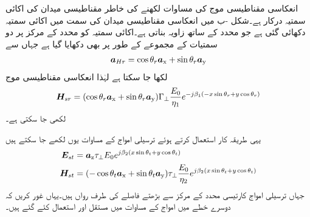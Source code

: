 انعکاسی مقناطیسی موج کی مساوات لکھنے کی خاطر مقناطیسی میدان کی اکائی سمتیہ درکار ہے۔شکل -ب میں انعکاسی مقناطیسی میدان کی سمت میں اکائی سمتیہ  دکھائی گئی ہے جو  محدد کے ساتھ  زاویہ بناتی ہے۔اکائی سمتیہ کو محدد کے مرکز پر دو سمتیات کے مجموعے کے طور پر بھی دکھایا گیا ہے جہاں سے
\begin{align}
{\ensuremath{{\boldsymbol{a}}}}_{Hr}=\cos \theta_r {\boldsymbol{a}}_{\textup{x}}+\sin \theta_r {\boldsymbol{a}}_{\textup{y}}
\end{align}
لکھا جا سکتا ہے لہٰذا انعکاسی مقناطیسی موج
\begin{align} \label{مساوات_ترچھی_انعکاسی_مقناطیسی_میدان_دوری_سمتی}
{\ensuremath{{\boldsymbol{H}}}}_{sr}=(\cos \theta_r {\boldsymbol{a}}_{\textup{x}}+\sin \theta_r {\boldsymbol{a}}_{\textup{y}})\Gamma_{\perp} \frac{ E_0}{\eta_1} e^{-j \beta_1 (-x \sin \theta_r+y\cos \theta_r)}
\end{align}
لکھی جا سکتی ہے۔

یہی طریقہ کار استعمال  کرتے ہوئے ترسیلی امواج کے مساوات یوں لکھے جا سکتے ہیں
\begin{align}
{\ensuremath{{\boldsymbol{E}}}}_{st} &={\boldsymbol{a}}_{\textup{z}} \tau_{\perp} E_0 e^{j \beta_2 (x \sin \theta_t+y\cos \theta_t)}  \label{مساوات_ترچھی_انحرافی_برقی_میدان_دوری_سمتی}\\
{{\boldsymbol{H}}}_{st} &=(-\cos \theta_t {\boldsymbol{a}}_{\textup{x}}+\sin \theta_t {\boldsymbol{a}}_{\textup{y}} ) \tau_{\perp} \frac{E_0}{\eta_2} e^{j \beta_2 (x \sin \theta_t+y\cos \theta_t)}  \label{مساوات_ترچھی_انحرافی_مقناطیسی_میدان_دوری_سمتی}
\end{align}
جہاں ترسیلی امواج کارتیسی محدد کے مرکز سے بڑھتے فاصلے کی طرف رواں ہیں۔یہاں غور کریں کہ دوسرے خطے میں امواج کے مساوات میں مستقل  اور  استعمال کئے گئے ہیں۔

